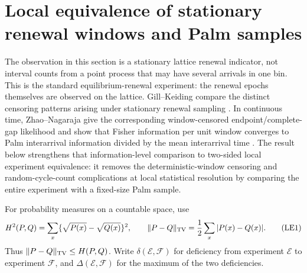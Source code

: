 \section{Local equivalence of stationary renewal windows and Palm samples}
\label{sec:renewal-equivalence-main}

The observation in this section is a stationary lattice renewal indicator,
not interval counts from a point process that may have several arrivals in
one bin.  This is the standard equilibrium-renewal experiment: the renewal
epochs themselves are observed on the lattice.  Gill--Keiding compare the
distinct censoring patterns arising under stationary renewal sampling
\cite{GillKeiding2010RenewalSampling}.  In continuous time,
Zhao--Nagaraja give the corresponding window-censored endpoint/complete-gap
likelihood and show that Fisher information per unit window converges to Palm
interarrival information divided by the mean interarrival time
\cite{ZhaoNagaraja2011WindowCensoredRenewal}.  The result below strengthens
that information-level comparison to two-sided local experiment equivalence:
it removes the
deterministic-window censoring and random-cycle-count complications at local
statistical resolution by comparing the entire experiment with a fixed-size
Palm sample.

For probability measures on a countable space, use
\[
 H^2(P,Q)=\sum_x\{\sqrt{P(x)}-\sqrt{Q(x)}\}^2,
 \qquad \|P-Q\|_{\rm TV}=\frac12\sum_x|P(x)-Q(x)|.
\tag{LE1}
\]
Thus \(\|P-Q\|_{\rm TV}\le H(P,Q)\).  Write
\(\delta(\mathcal E,\mathcal F)\) for deficiency from experiment
\(\mathcal E\) to experiment \(\mathcal F\), and
\(\Delta(\mathcal E,\mathcal F)\) for the maximum of the two deficiencies.

